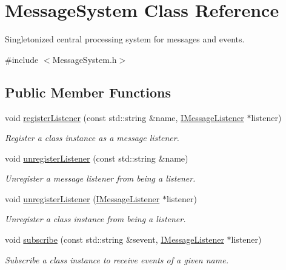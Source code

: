 \hypertarget{class_message_system}{}\section{Message\+System Class Reference}
\label{class_message_system}


Singletonized central processing system for messages and events.  




{\ttfamily \#include $<$Message\+System.\+h$>$}

\subsection*{Public Member Functions}
\begin{DoxyCompactItemize}
\item 
void \hyperlink{class_message_system_a91321ec1bf6906c05d3822da67a9c6bf}{register\+Listener} (const std\+::string \&name, \hyperlink{class_i_message_listener}{I\+Message\+Listener} $\ast$listener)
\begin{DoxyCompactList}\small\item\em Register a class instance as a message listener. \end{DoxyCompactList}\item 
void \hyperlink{class_message_system_accddc135ff948b8278d35463548327e2}{unregister\+Listener} (const std\+::string \&name)
\begin{DoxyCompactList}\small\item\em Unregister a message listener from being a listener. \end{DoxyCompactList}\item 
void \hyperlink{class_message_system_af555d4baae75e939aa5f388284138547}{unregister\+Listener} (\hyperlink{class_i_message_listener}{I\+Message\+Listener} $\ast$listener)
\begin{DoxyCompactList}\small\item\em Unregister a class instance from being a listener. \end{DoxyCompactList}\item 
void \hyperlink{class_message_system_aae34b407afa37e0a5b8c8eab0cf986b0}{subscribe} (const std\+::string \&sevent, \hyperlink{class_i_message_listener}{I\+Message\+Listener} $\ast$listener)
\begin{DoxyCompactList}\small\item\em Subscribe a class instance to receive events of a given name. \end{DoxyCompactList}\item 

\end{DoxyCompactItemize}
